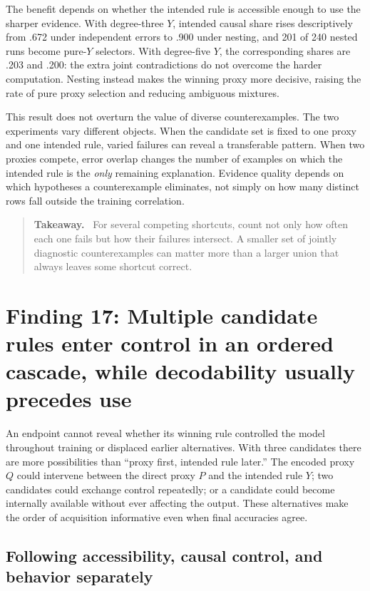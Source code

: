\documentclass[11pt,a4paper]{article}
\newenvironment{takeaway}{%
  \begin{quote}\small\color{ink}\noindent\textbf{Takeaway.}\ 
}{%
  \end{quote}
}
\begin{document}
The benefit depends on whether the intended rule is accessible enough to use the sharper evidence. With degree-three $Y$, intended causal share rises descriptively from .672 under independent errors to .900 under nesting, and 201 of 240 nested runs become pure-$Y$ selectors. With degree-five $Y$, the corresponding shares are .203 and .200: the extra joint contradictions do not overcome the harder computation. Nesting instead makes the winning proxy more decisive, raising the rate of pure proxy selection and reducing ambiguous mixtures.

This result does not overturn the value of diverse counterexamples. The two experiments vary different objects. When the candidate set is fixed to one proxy and one intended rule, varied failures can reveal a transferable pattern. When two proxies compete, error overlap changes the number of examples on which the intended rule is the \emph{only} remaining explanation. Evidence quality depends on which hypotheses a counterexample eliminates, not simply on how many distinct rows fall outside the training correlation.

\begin{takeaway}
For several competing shortcuts, count not only how often each one fails but how their failures intersect. A smaller set of jointly diagnostic counterexamples can matter more than a larger union that always leaves some shortcut correct.
\end{takeaway}

\section*{Finding 17: Multiple candidate rules enter control in an ordered cascade, while decodability usually precedes use}

An endpoint cannot reveal whether its winning rule controlled the model throughout training or displaced earlier alternatives. With three candidates there are more possibilities than ``proxy first, intended rule later.'' The encoded proxy $Q$ could intervene between the direct proxy $P$ and the intended rule $Y$; two candidates could exchange control repeatedly; or a candidate could become internally available without ever affecting the output. These alternatives make the order of acquisition informative even when final accuracies agree.

\subsection*{Following accessibility, causal control, and behavior separately}
\end{document}
